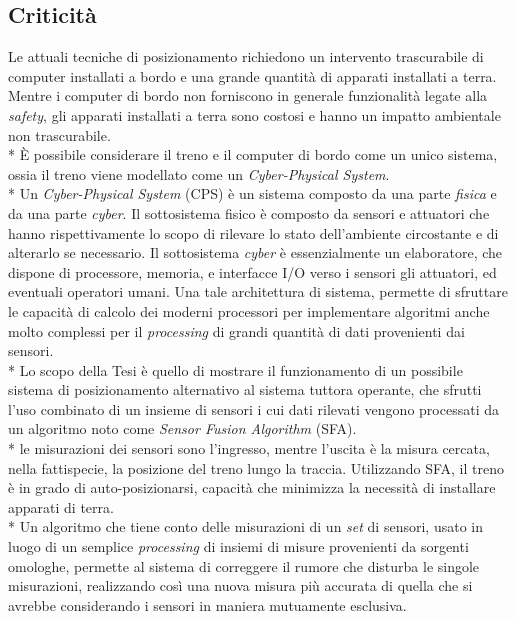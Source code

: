 \subsection{Criticit\`a}
Le attuali tecniche di posizionamento richiedono un intervento trascurabile di computer installati a bordo e una grande quantit\`a di apparati installati a terra. Mentre i computer di bordo non forniscono in generale funzionalit\`a legate alla \emph{safety}, gli apparati installati a terra sono costosi e hanno un impatto ambientale non trascurabile.\\*
\`E possibile considerare il treno e il computer di bordo come un unico sistema, ossia il treno viene modellato come un \emph{Cyber-Physical System}.\\*
Un \emph{Cyber-Physical System} (CPS) \`e un sistema composto da una parte \emph{fisica} e da una parte \emph{cyber}. Il sottosistema fisico \`e composto da sensori e attuatori che hanno rispettivamente lo scopo di rilevare lo stato dell'ambiente circostante e di alterarlo se necessario. Il sottosistema \emph{cyber} \`e essenzialmente un elaboratore, che dispone di processore, memoria, e interfacce I/O verso i sensori gli attuatori, ed eventuali operatori  umani. Una tale architettura di sistema, permette di sfruttare le capacit\`a di calcolo dei moderni processori per implementare algoritmi anche molto complessi per il \emph{processing} di grandi quantit\`a di dati provenienti dai sensori.\\*
Lo scopo della Tesi \`e quello di mostrare il funzionamento di un possibile sistema di posizionamento alternativo al sistema tuttora operante, che sfrutti l'uso combinato di un insieme di sensori i cui dati rilevati vengono processati da un algoritmo noto come \emph{Sensor Fusion Algorithm} (SFA).\\*
 le misurazioni dei sensori sono l'ingresso, mentre l'uscita \`e la misura cercata, nella fattispecie, la posizione del treno lungo la traccia.
Utilizzando SFA, il treno \`e in grado di auto-posizionarsi, capacit\`a che minimizza la necessit\`a di installare apparati di terra.\\*
Un algoritmo che tiene conto delle misurazioni di un \emph{set} di sensori, usato in luogo di un semplice \emph{processing} di insiemi di misure provenienti da sorgenti omologhe, permette al sistema di correggere il rumore che disturba le singole misurazioni, realizzando cos\`i una nuova misura pi\`u accurata di quella che si avrebbe considerando i sensori in maniera mutuamente esclusiva.